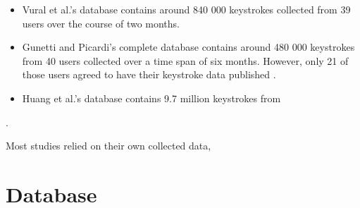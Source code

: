 \documentclass[informationsecurity]{gucmasterproject}
\begin{document}
\begin{itemize}
    \item Vural et al.'s \cite{vural} database contains around 840 000 keystrokes collected from 39 users over the course of two months.
    
    \item Gunetti and Picardi's \cite{gnp} complete database contains around 480 000 keystrokes from 40 users collected over a time span of six months. However, only 21 of those users agreed to have their keystroke data published \cite{Solami}.
    
    \item Huang et al.'s \cite{sliding} database contains 9.7 million keystrokes from 
\end{itemize}

\cite{vural, gnp, sliding}.


Most studies relied on their own collected data, 


\section{Database}



\end{document}
